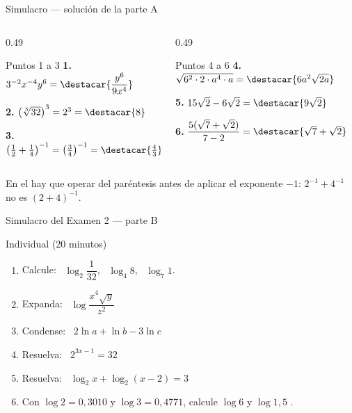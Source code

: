 \documentclass[aspectratio=169,10pt]{beamer}
\begin{document}
\begin{frame}{Simulacro — solución de la parte A}
  \scriptsize
  \begin{columns}[T,onlytextwidth]
    \begin{column}{0.49\textwidth}
      \begin{block}{Puntos 1 a 3}
        \tiny
        \textbf{1.} $3^{-2}x^{-4}y^{6} = \destacar{\dfrac{y^{6}}{9x^{4}}}$

        \vspace{0.08cm}
        \textbf{2.} $\left(\sqrt[5]{32}\right)^{3} = 2^{3} = \destacar{8}$

        \vspace{0.08cm}
        \textbf{3.} $\left(\tfrac{1}{2}+\tfrac{1}{4}\right)^{-1}
        = \left(\tfrac{3}{4}\right)^{-1} = \destacar{\tfrac{4}{3}}$
      \end{block}
    \end{column}
    \begin{column}{0.49\textwidth}
      \begin{block}{Puntos 4 a 6}
        \tiny
        \textbf{4.} $\sqrt{6^{2}\cdot 2\cdot a^{4}\cdot a}
        = \destacar{6a^{2}\sqrt{2a}}$

        \vspace{0.08cm}
        \textbf{5.} $15\sqrt2 - 6\sqrt2 = \destacar{9\sqrt{2}}$

        \vspace{0.08cm}
        \textbf{6.} $\dfrac{5(\sqrt7+\sqrt2)}{7-2}
        = \destacar{\sqrt{7}+\sqrt{2}}$
      \end{block}
    \end{column}
  \end{columns}

  \vspace{0.05cm}
  {\tiny\color{uniGris} En el  hay que operar  del
  paréntesis antes de aplicar el exponente $-1$: $2^{-1}+4^{-1}$ no es
  $(2+4)^{-1}$.}
\end{frame}

\begin{frame}{Simulacro del Examen 2 — parte B}
  \begin{alertblock}{Individual (20 minutos)}
    \scriptsize
    \begin{enumerate}\setlength{\itemsep}{0.04cm}
      \item Calcule: \ $\log_{2}\dfrac{1}{32}$, \ $\log_{4}8$, \
            $\log_{7}1$.
      \item Expanda: \ $\log\dfrac{x^{4}\sqrt{y}}{z^{2}}$
      \item Condense: \ $2\ln a + \ln b - 3\ln c$
      \item Resuelva: \ $2^{3x-1} = 32$
      \item Resuelva: \ $\log_{2}x + \log_{2}(x-2) = 3$
      \item Con $\log 2 = 0{,}3010$ y $\log 3 = 0{,}4771$, calcule
            $\log 6$ y $\log 1{,}5$ \destacar{sin calculadora}.
    \end{enumerate}
  \end{alertblock}
\end{frame}
\end{document}
